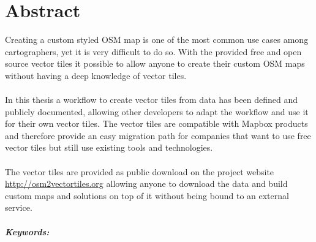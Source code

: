

\begingroup
\let\clearpage\relax
\let\cleardoublepage\relax
\let\cleardoublepage\relax

\chapter*{Abstract} %

Creating a custom styled OSM map is one of the most common use cases
among cartographers, yet it is very difficult to do so. With the provided 
free and open source vector tiles it possible to allow anyone to
create their custom OSM maps without having a deep knowledge of vector tiles.
\\\\
In this thesis a workflow to create vector tiles from \osm{} data has been defined and publicly documented, allowing other developers to adapt the workflow and use it for their own vector tiles.
The vector tiles are compatible with Mapbox products and therefore provide an easy migration path for companies that want to use free vector tiles but still use existing tools and technologies.
\\\\
The vector tiles are provided as public download on the project website \url{http://osm2vectortiles.org} allowing anyone to download the data and build custom maps and solutions on top of it without being bound to an external service.

\endgroup			

\paragraph{Keywords:}\mbox{}\\
\textit{\myKeywords}

\vfill
